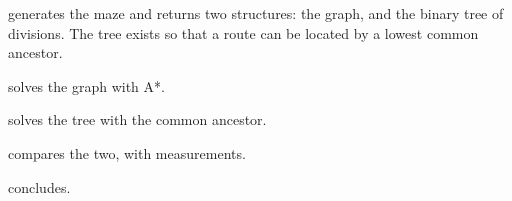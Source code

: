\begin{description}[leftmargin=*,style=nextline,itemsep=3pt]
  \item[Section~\ref{sec:generation}] generates the maze and returns two
    structures: the graph, and the binary tree of divisions. The tree exists so
    that a route can be located by a lowest common ancestor.
  \item[Section~\ref{sec:astar}] solves the graph with A*.
  \item[Section~\ref{sec:lca}] solves the tree with the common ancestor.
  \item[Section~\ref{sec:comparison}] compares the two, with measurements.
  \item[Section~\ref{sec:conclusion}] concludes.
\end{description}
